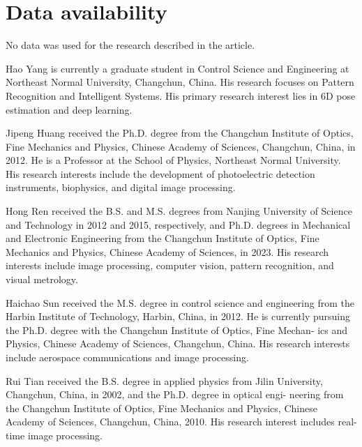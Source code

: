 \documentclass[a4paper,fleqn]{cas-sc}
\begin{document}
\section*{Data availability}

No data was used for the research described in the article. 

\printcredits





Hao Yang is currently a graduate student in Control Science and Engineering at Northeast Normal University, Changchun, China. His research focuses on Pattern Recognition and Intelligent Systems. His primary research interest lies in 6D pose estimation and deep learning.
\endbio

\vskip6pc

Jipeng Huang received the Ph.D. degree from the Changchun Institute of Optics, Fine Mechanics and Physics, Chinese Academy of Sciences, Changchun, China, in 2012. He is a Professor at the School of Physics, Northeast Normal University. His research interests include the development of photoelectric detection instruments, biophysics, and digital image processing.

\endbio


\vskip6pc

Hong Ren received the B.S. and M.S. degrees from Nanjing University of Science and Technology in 2012 and 2015, respectively, and Ph.D. degrees in Mechanical and Electronic Engineering from the Changchun Institute of Optics, Fine Mechanics and Physics, Chinese Academy of Sciences, in 2023. His research interests include image processing, computer vision, pattern recognition, and visual metrology.

\endbio


\vskip6pc

Haichao Sun received the M.S. degree in
control science and engineering from the Harbin
Institute of Technology, Harbin, China, in 2012.
He is currently pursuing the Ph.D. degree with
the Changchun Institute of Optics, Fine Mechan-
ics and Physics, Chinese Academy of Sciences,
Changchun, China. His research interests include
aerospace communications and image processing.

\endbio

\vskip6pc
Rui Tian received the B.S. degree in applied
physics from Jilin University, Changchun, China,
in 2002, and the Ph.D. degree in optical engi-
neering from the Changchun Institute of Optics,
Fine Mechanics and Physics, Chinese Academy of
Sciences, Changchun, China, 2010. His research
interest includes real-time image processing.

\endbio
\end{document}
